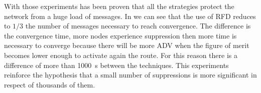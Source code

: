With those experiments has been proven that all the strategies protect the
network from a huge load of messages.
In  we can see that the use of \ac{RFD}
reduces to $1/3$ the number of messages necessary to reach convergence.
The difference is the convergence time, more nodes experience suppression
then more time is necessary to converge because there will be more \ac{ADV} when
the figure of merit becomes lower enough to activate again the route.
For this reason there is a difference of more than \SI{1000}{\second} between
the techniques.
This experiments reinforce the hypothesis that a small number of suppressions is
more significant in respect of thousands of them.

